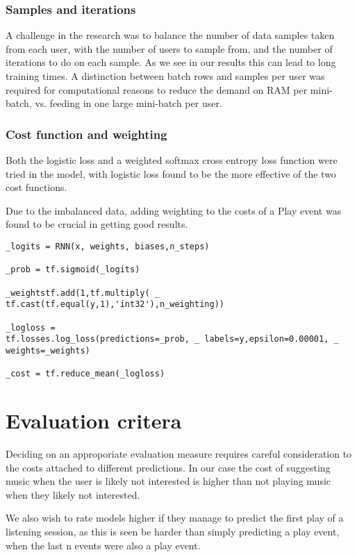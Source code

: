 \subsubsection{Samples and iterations}

A challenge in the research was to balance the number of data samples taken from each user, with the number of users to sample from, and the number of iterations to do on each sample. As we see in our results this can lead to long training times. A distinction between batch rows and samples per user was required for computational reasons to reduce the demand on RAM per mini-batch, vs. feeding in one large mini-batch per user.

\subsubsection{Cost function and weighting}

Both the logistic loss and a weighted softmax cross entropy loss function were tried in the model, with logistic loss found to be the more effective of the two cost functions. 

Due to the imbalanced data, adding weighting to the costs of a Play event was found to be crucial in getting good results.


\begin{lstlisting}
_logits = RNN(x, weights, biases,n_steps)

_prob = tf.sigmoid(_logits)

_weightstf.add(1,tf.multiply( _
tf.cast(tf.equal(y,1),'int32'),n_weighting))

_logloss =
tf.losses.log_loss(predictions=_prob, _ labels=y,epsilon=0.00001, _ 
weights=_weights)

_cost = tf.reduce_mean(_logloss)
\end{lstlisting}


\section{Evaluation critera}

Deciding on an approporiate evaluation measure requires careful consideration to the costs attached to different predictions. In our case the cost of suggesting music when the user is likely not interested is higher than not playing music when they likely not interested. 

We also wish to rate models higher if they manage to predict the first play of a listening session, as this is seen be harder than simply predicting a play event, when the last n events were also a play event.

